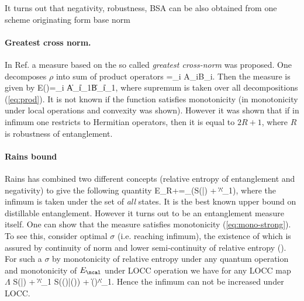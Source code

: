 \documentclass[twocolumn,aps,rmp]{revtex4}
\begin{document}
It turns out that negativity, robustness, BSA can be also obtained from one
scheme originating form base norm \cite{Vidal-Werner,PlenioVirmani2006-review}

\paragraph{Greatest cross norm.}
In Ref. \cite{Rudolph2001-measureJMP} a measure based on the so called {\it greatest cross-norm} was
proposed. One decomposes $\rho$ into sum of product operators
\be
\rho=\sum_i A_i\ot B_i.
\label{eq:prod}
\ee
Then the measure is given by
\be
E(\rho)=\sup\sum_i \|A_i\|_1\cdot \|B_i\|_1,
\ee
where supremum is taken over all decompositions (\ref{eq:prod}).
It is not known if the function satisfies monotonicity (in \cite{Rudolph2001-measureJMP} monotonicity under local operations
and convexity was shown).
However it was shown \cite{Rudolph2002-criterion} that  if in infimum one restricts to Hermitian operators,
then it is equal to $2R+1$, where $R$ is robustness of entanglement.

\paragraph{Rains bound}
Rains \cite{Rains2001}  has combined two different concepts (relative entropy of entanglement
and negativity) to give the following quantity
\be
E_{R+\ncal}=\inf_\sigma \left(S(\varrho|\sigma) + \|\sigma^\Gamma\|_1\right),
\ee
where the infimum is taken under the set of {\it all} states.
It is the best known upper bound on distillable entanglement. However it
turns out to be an entanglement measure itself.  One can show that
the measure satisfies  monotonicity (\ref{eq:mono-strong}).
To see this, consider optimal $\sigma$ (i.e. reaching infimum),  the existence of which is assured by continuity of norm and lower semi-continuity of relative
entropy (\cite{OhyaPetz}). For such a $\sigma$ by monotonicity of relative entropy under any
quantum operation and monotonicity of $E_\ncal$ under LOCC operation we have for any LOCC map $\Lambda$
\be
 S(\varrho|\sigma) + \|\sigma^{\Gamma}\|_1 \geq
 S(\Lambda(\varrho)|\Lambda(\sigma)) + \|\Lambda(\sigma)^{\Gamma}\|_1.
\ee
Hence the infimum  can not be increased under LOCC.
\end{document}
